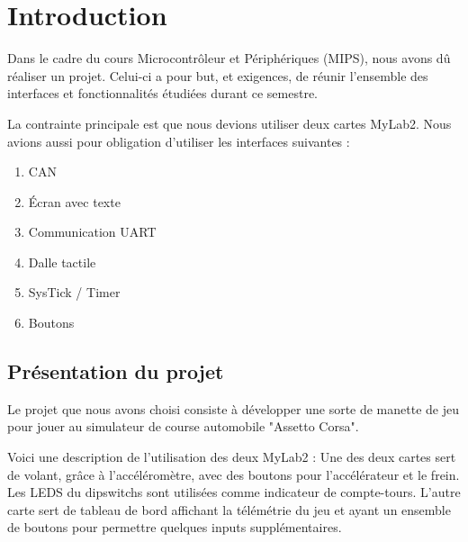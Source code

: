 \documentclass[french, 11pt]{article}
\newcommand{\blankpage}
{
	\null
	\thispagestyle{empty}
	\addtocounter{page}{-1}
	\newpage
}
\begin{document}
\begin{titlepage}
\begin{minipage}{0.53\textwidth}
		\end{minipage}
	
	\end{titlepage}
	
	\blankpage

	{\hypersetup{hidelinks} \tableofcontents}
	
	\pagebreak
	
	{\hypersetup{hidelinks} \listoffigures}
	
	{\hypersetup{hidelinks} \lstlistoflistings}
	
	\pagebreak

    \section{Introduction}

    Dans le cadre du cours Microcontrôleur et Périphériques (MIPS), nous avons dû réaliser un projet. Celui-ci a pour but, et exigences, de réunir l'ensemble des interfaces et fonctionnalités étudiées durant ce semestre.

    La contrainte principale est que nous devions utiliser deux cartes MyLab2. Nous avions aussi pour obligation d'utiliser les interfaces suivantes :

    \begin{enumerate}
        \item CAN
        \item Écran avec texte
        \item Communication UART
        \item Dalle tactile
        \item SysTick / Timer
        \item Boutons
    \end{enumerate}

    \subsection{Présentation du projet}

    Le projet que nous avons choisi consiste à développer une sorte de manette de jeu pour jouer au simulateur de course automobile "Assetto Corsa". 
	
	Voici une description de l'utilisation des deux MyLab2 : 
	Une des deux cartes sert de volant, grâce à l'accéléromètre, avec des boutons pour l'accélérateur et le frein. Les LEDS du dipswitchs sont utilisées comme indicateur de compte-tours. L'autre carte sert de tableau de bord affichant la télémétrie du jeu et ayant un ensemble de boutons pour permettre quelques inputs supplémentaires.
\end{document}
